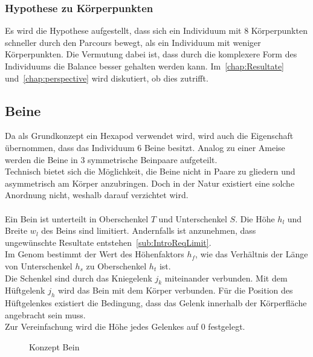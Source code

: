       \subsubsection{Hypothese zu Körperpunkten\label{subsub:hypoKp}}

        Es wird die Hypothese aufgestellt,
        dass sich ein Individuum mit 8 Körperpunkten schneller durch den Parcours bewegt,
        als ein Individuum mit weniger Körperpunkten.
        Die Vermutung dabei ist, dass durch die komplexere Form des Individuums die Balance besser gehalten werden kann.
        Im~\vref{chap:Resultate} und~\vref{chap:perspective} wird diskutiert, ob dies zutrifft.

    \subsection{Beine\label{sub:Beine}}

      Da als Grundkonzept ein \gls{Hexapod} verwendet wird, wird auch die Eigenschaft übernommen,
      dass das Individuum 6 Beine besitzt.
      Analog zu einer Ameise werden die Beine in 3 symmetrische Beinpaare aufgeteilt.
      \\
      Technisch bietet sich die Möglichkeit, die Beine nicht in Paare zu gliedern und asymmetrisch am Körper anzubringen.
      Doch in der Natur existiert eine solche Anordnung nicht, weshalb darauf verzichtet wird.
      \\
      \\
      Ein Bein ist unterteilt in Oberschenkel \(T\) und Unterschenkel \(S\).
      Die Höhe \(h_{l}\) und Breite \(w_{l}\) des Beins sind limitiert.
      Andernfalls ist anzunehmen, dass ungewünschte Resultate entstehen~\vref{sub:IntroReqLimit}.
      \\
      Im Genom bestimmt der Wert des Höhenfaktors \(h_{f}\),
      wie das Verhältnis der Länge von Unterschenkel \(h_{s}\) zu Oberschenkel \(h_{t}\) ist.
      \\
      Die Schenkel sind durch das Kniegelenk \(j_{k}\) miteinander verbunden.
      Mit dem Hüftgelenk \(j_{h}\) wird das Bein mit dem Körper verbunden.
      Für die Position des Hüftgelenkes existiert die Bedingung,
      dass das Gelenk innerhalb der Körperfläche angebracht sein muss.
      \\
      Zur Vereinfachung wird die Höhe jedes Gelenkes auf 0 festgelegt.

      \begin{figure}[H]
        \centering
        
        \caption{Konzept Bein\label{fig:conceptLeg}}
      \end{figure}

